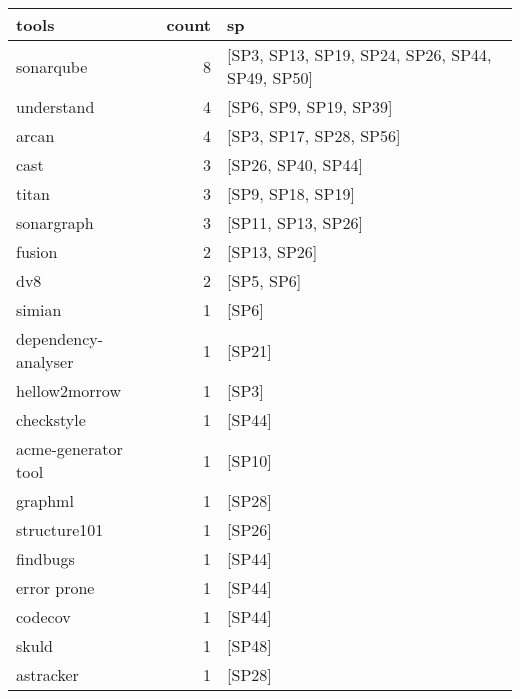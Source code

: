 \begin{tabular}{lrl}
\toprule
               tools &  count &                                               sp \\
\midrule
           sonarqube &      8 &  [SP3, SP13, SP19, SP24, SP26, SP44, SP49, SP50] \\
          understand &      4 &                           [SP6, SP9, SP19, SP39] \\
               arcan &      4 &                          [SP3, SP17, SP28, SP56] \\
                cast &      3 &                               [SP26, SP40, SP44] \\
               titan &      3 &                                [SP9, SP18, SP19] \\
          sonargraph &      3 &                               [SP11, SP13, SP26] \\
              fusion &      2 &                                     [SP13, SP26] \\
                 dv8 &      2 &                                       [SP5, SP6] \\
              simian &      1 &                                            [SP6] \\
 dependency-analyser &      1 &                                           [SP21] \\
       hellow2morrow &      1 &                                            [SP3] \\
          checkstyle &      1 &                                           [SP44] \\
 acme-generator tool &      1 &                                           [SP10] \\
             graphml &      1 &                                           [SP28] \\
        structure101 &      1 &                                           [SP26] \\
            findbugs &      1 &                                           [SP44] \\
         error prone &      1 &                                           [SP44] \\
             codecov &      1 &                                           [SP44] \\
               skuld &      1 &                                           [SP48] \\
           astracker &      1 &                                           [SP28] \\

\end{tabular}
